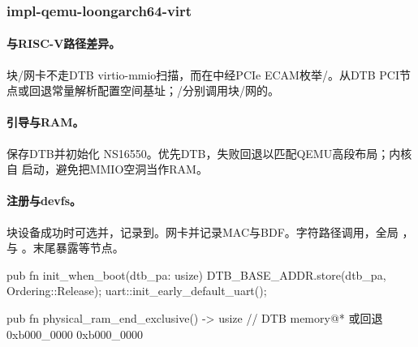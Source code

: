 
\subsubsection{impl-qemu-loongarch64-virt}

\paragraph{与RISC-V路径差异。}块/网卡不走DTB virtio-mmio扫描，而在中经PCIe ECAM枚举/。从DTB PCI节点或回退常量解析配置空间基址；/分别调用块/网的。

\paragraph{引导与RAM。}保存DTB并初始化 NS16550。优先DTB，失败回退以匹配QEMU高段布局；内核自  启动，避免把MMIO空洞当作RAM。

\paragraph{注册与devfs。}块设备成功时可选并，记录到。网卡并记录MAC与BDF。字符路径调用，全局 ，与 。末尾暴露等节点。

\begin{rustcode}
pub fn init_when_boot(dtb_pa: usize) {
    DTB_BASE_ADDR.store(dtb_pa, Ordering::Release);
    uart::init_early_default_uart();
}

pub fn physical_ram_end_exclusive() -> usize {
    // DTB memory@* 或回退 0xb000_0000
    0xb000_0000
}
\end{rustcode}

